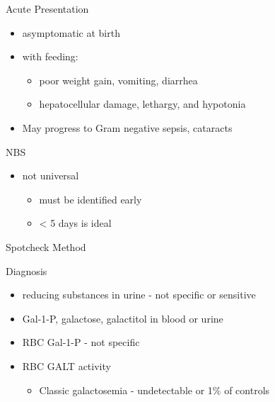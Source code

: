\documentclass[presentation, smaller]{beamer}
\begin{document}
\begin{frame}[label={sec:org00a127d}]{Acute Presentation}
\begin{itemize}
\item asymptomatic at birth
\item with feeding:
\begin{itemize}
\item poor weight gain, vomiting, diarrhea
\item hepatocellular damage, lethargy, and hypotonia
\end{itemize}
\item May progress to Gram negative sepsis, cataracts
\end{itemize}
\end{frame}

\begin{frame}[label={sec:orgd600043}]{NBS}
\begin{itemize}
\item not universal
\begin{itemize}
\item must be identified early
\item \textless{} 5 days is ideal
\end{itemize}
\end{itemize}
\end{frame}

\begin{frame}[label={sec:org5ae68b5}]{Spotcheck Method}



\end{frame}

\begin{frame}[label={sec:org0269ad1}]{Diagnosis}
\begin{itemize}
\item reducing substances in urine - not specific or sensitive
\item Gal-1-P, galactose, galactitol in blood or urine
\item RBC Gal-1-P - not specific
\item RBC GALT activity
\begin{itemize}
\item Classic galactosemia - undetectable or 1\% of controls
\end{itemize}
\end{itemize}
\end{frame}
\end{document}
